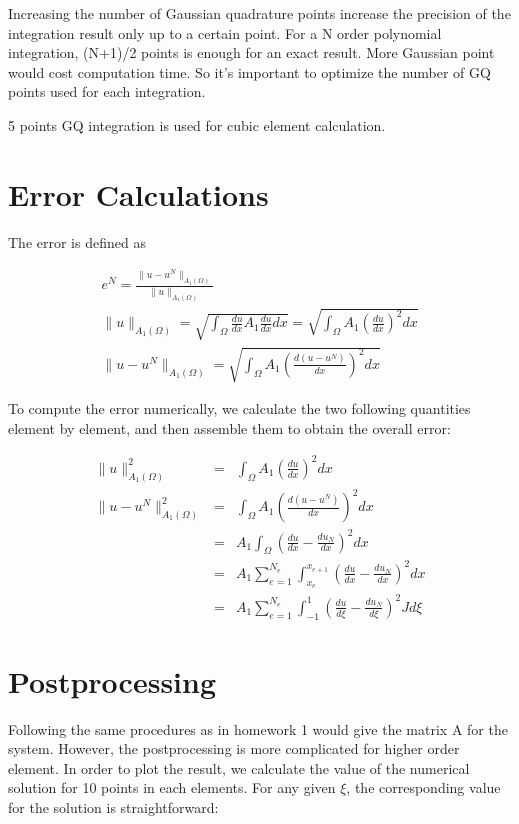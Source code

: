 \documentclass[paper=a4, fontsize=11pt]{article} %
\begin{document}
Increasing the number of Gaussian quadrature points increase the precision of the integration result only up to a certain point. For a N order polynomial integration, (N+1)/2 points is enough for an exact result. More Gaussian point would cost computation time. So it's important to optimize the number of GQ points used for each integration. 

5 points GQ integration is used for cubic element calculation.

\section{Error Calculations}
The error is defined as 

\begin{eqnarray}
e^N = \frac{\| u -u^N \| _{A_1(\Omega)}} {\| u \| _{A_1 (\Omega)}} \nonumber\\
\| u \| _{A_1 (\Omega)} = \sqrt{\int_{\Omega} \frac{du}{dx} A_1 \frac{du}{dx} dx} = \sqrt{\int_{\Omega} A_1(\frac{du}{dx})^2 dx}\nonumber\\
\| u -u^N \| _{A_1(\Omega)} = \sqrt{\int_{\Omega} A_1 (\frac{d(u-u^N)}{dx})^2 dx}
\end{eqnarray}

To compute the error numerically, we calculate the two following quantities element by element, and then assemble them to obtain the overall error:

\begin{eqnarray}
\| u \| _{A_1 (\Omega)}^2 &=&\int_{\Omega} A_1(\frac{du}{dx})^2 dx\nonumber\\
\| u -u^N \| _{A_1(\Omega)} ^2 &=& \int_{\Omega} A_1 (\frac{d(u-u^N)}{dx})^2 dx\nonumber\\
&=& A_1 \int_{\Omega} (\frac{du}{dx} - \frac{du_N}{dx})^2 dx\nonumber\\
&=& A_1 \sum_{e=1}^{N_e} \int_{x_e}^{x_{e+1}} (\frac{du}{dx} - \frac{du_N}{dx})^2 dx \nonumber\\
&=& A_1 \sum_{e=1}^{N_e} \int_{-1}^{1} (\frac{du}{d\xi} - \frac{du_N}{d\xi})^2 J d\xi
\end{eqnarray}

\section{Postprocessing}
Following the same procedures as in homework 1 would give the matrix A for the system. However, the postprocessing is more complicated for higher order element. In order to plot the result, we calculate the value of the numerical solution for 10 points in each elements. For any given $\xi$, the corresponding value for the solution is straightforward:
\end{document}
